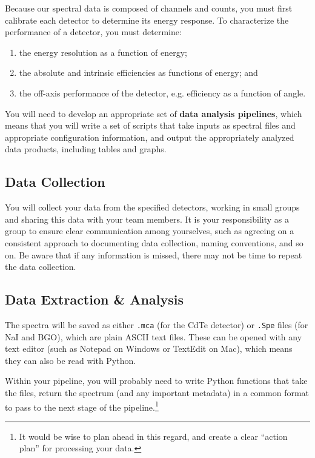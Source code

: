 \documentclass{tufte-book}
\begin{document}
Because our spectral data is composed of channels and counts, you must first calibrate each detector to determine its energy response. To characterize the performance of a detector, you must determine: 

\begin{enumerate}
    \item the energy resolution as a function of energy;
    \item the absolute and intrinsic efficiencies as functions of energy; and
    \item the off-axis performance of the detector, e.g. efficiency as a function of angle.
\end{enumerate}

You will need to develop an appropriate set of \textbf{data analysis pipelines}, which means that you will write a set of scripts that take inputs as spectral files and appropriate configuration information, and output the appropriately analyzed data products, including tables and graphs.

\subsection{Data Collection}
\label{subsec:he-data-collect}
You will collect your data from the specified detectors, working in small groups and sharing this data with your team members. It is your responsibility as a group to ensure clear communication among yourselves, such as agreeing on a consistent approach to documenting data collection, naming conventions, and so on. Be aware that if any information is missed, there may not be time to repeat the data collection.

\subsection{Data Extraction \& Analysis}
\label{subsec:he-analysis}
The spectra will be saved as either \verb|.mca| (for the CdTe detector) or \verb|.Spe| files (for NaI and BGO), which are plain ASCII text files. These can be opened with any text editor (such as Notepad on Windows or TextEdit on Mac), which means they can also be read with Python.

Within your pipeline, you will probably need to write Python functions that take the files, return the spectrum (and any important metadata) in a common format to pass to the next stage of the pipeline.\footnote{It would be wise to plan ahead in this regard, and create a clear ``action plan'' for processing your data.}
\end{document}

